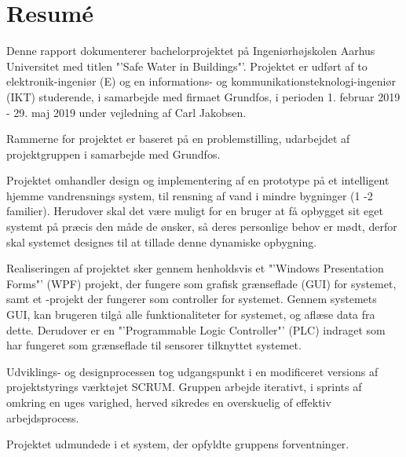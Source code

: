 
\chapter*{Resumé}
Denne rapport dokumenterer bachelorprojektet på Ingeniørhøjskolen Aarhus Universitet med titlen "'Safe Water in Buildings"'. Projektet er udført af to elektronik-ingeniør (E) og en informations- og kommunikationsteknologi-ingeniør (IKT) studerende, i samarbejde med firmaet Grundfos, i perioden 1. februar 2019 - 29. maj 2019 under vejledning af Carl Jakobsen.

Rammerne for projektet er baseret på en problemstilling, udarbejdet af projektgruppen i samarbejde med Grundfos.

Projektet omhandler design og implementering af en prototype på et intelligent hjemme vandrensnings system, til rensning af vand i mindre bygninger (1 -2 familier). Herudover skal det være muligt for en bruger at få opbygget sit eget systemt på præcis den måde de ønsker, så deres personlige behov er mødt, derfor skal systemet designes til at tillade denne dynamiske opbygning.

Realiseringen af projektet sker gennem henholdsvis et "'Windows Presentation Forms"' (WPF) projekt, der fungere som grafisk grænseflade (GUI) for systemet, samt et \CS-projekt der fungerer som controller for systemet. Gennem systemets GUI, kan brugeren tilgå alle funktionaliteter for systemet, og aflæse data fra dette. Derudover er en "'Programmable Logic Controller"' (PLC) indraget som har fungeret som grænseflade til sensorer tilknyttet systemet.

Udviklings- og designprocessen tog udgangspunkt i en modificeret versions af projektstyrings værktøjet SCRUM. Gruppen arbejde iterativt, i sprints af omkring en uges varighed, herved sikredes en overskuelig of effektiv arbejdsprocess.

Projektet udmundede i et system, der opfyldte gruppens forventninger.